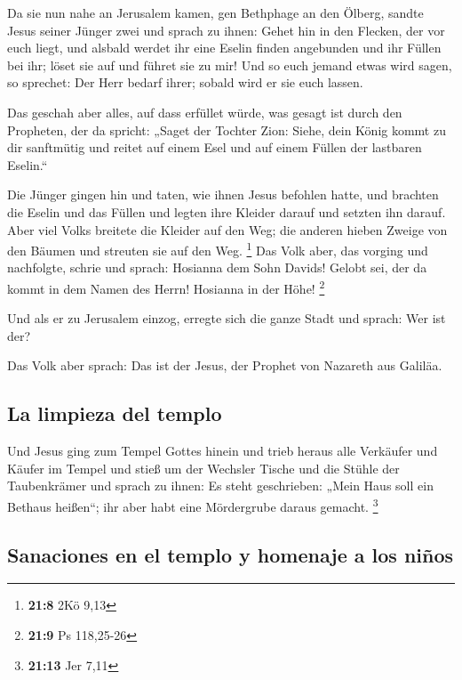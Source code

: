  Da sie nun nahe an Jerusalem kamen, gen Bethphage an den
Ölberg, sandte Jesus seiner Jünger zwei  und sprach zu
ihnen: Gehet hin in den Flecken, der vor euch liegt, und alsbald werdet
ihr eine Eselin finden angebunden und ihr Füllen bei ihr; löset sie auf
und führet sie zu mir!  Und so euch jemand etwas wird
sagen, so sprechet: Der Herr bedarf ihrer; sobald wird er sie euch
lassen.

 Das geschah aber alles, auf dass erfüllet würde, was
gesagt ist durch den Propheten, der da spricht:  „Saget
der Tochter Zion: Siehe, dein König kommt zu dir sanftmütig und reitet
auf einem Esel und auf einem Füllen der lastbaren Eselin.``

 Die Jünger gingen hin und taten, wie ihnen Jesus befohlen
hatte,  und brachten die Eselin und das Füllen und legten
ihre Kleider darauf und setzten ihn darauf.  Aber viel
Volks breitete die Kleider auf den Weg; die anderen hieben Zweige von
den Bäumen und streuten sie auf den Weg. \footnote{\textbf{21:8} 2Kö
  9,13}  Das Volk aber, das vorging und nachfolgte, schrie
und sprach: Hosianna dem Sohn Davids! Gelobt sei, der da kommt in dem
Namen des Herrn! Hosianna in der Höhe! \footnote{\textbf{21:9} Ps
  118,25-26}

 Und als er zu Jerusalem einzog, erregte sich die ganze
Stadt und sprach: Wer ist der?

 Das Volk aber sprach: Das ist der Jesus, der Prophet von
Nazareth aus Galiläa.

\hypertarget{la-limpieza-del-templo}{%
\subsection{La limpieza del templo}\label{la-limpieza-del-templo}}

 Und Jesus ging zum Tempel Gottes hinein und trieb heraus
alle Verkäufer und Käufer im Tempel und stieß um der Wechsler Tische und
die Stühle der Taubenkrämer  und sprach zu ihnen: Es
steht geschrieben: „Mein Haus soll ein Bethaus heißen``; ihr aber habt
eine Mördergrube daraus gemacht. \footnote{\textbf{21:13} Jer 7,11}

\hypertarget{sanaciones-en-el-templo-y-homenaje-a-los-niuxf1os}{%
\subsection{Sanaciones en el templo y homenaje a los
niños}\label{sanaciones-en-el-templo-y-homenaje-a-los-niuxf1os}}

